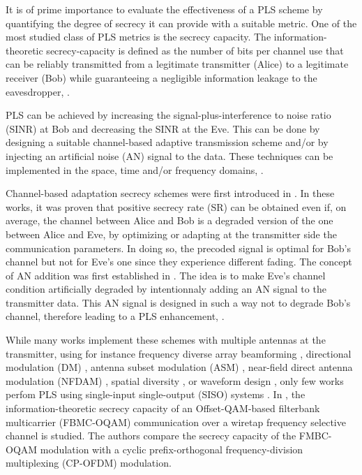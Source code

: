 \documentclass[journal,comsoc]{IEEEtran}
\begin{document}
It is of prime importance to evaluate the effectiveness of a PLS scheme by quantifying the degree of secrecy it can provide with a suitable metric. One of the most studied class of PLS metrics is the secrecy capacity. The information-theoretic secrecy-capacity is defined as the number of bits per channel use that can be reliably transmitted from a legitimate transmitter (Alice) to a legitimate receiver (Bob) while guaranteeing a negligible information leakage to the eavesdropper, \cite{bloch_barros_2011}.

 PLS can be achieved by increasing the signal-plus-interference to noise ratio (SINR) at Bob and decreasing the SINR at the Eve. This can be done by designing a suitable channel-based adaptive transmission scheme and/or by injecting an artificial noise (AN) signal to the data. These techniques can be implemented in the space, time and/or frequency domains, \cite{8509094,7762075,MELKI20191}.

Channel-based adaptation secrecy schemes were first introduced in \cite{4529264,4529282,4626059}. In these works, it was proven that positive secrecy rate (SR) can be obtained even if, on average, the channel between Alice and Bob is a degraded version of the one between Alice and Eve, by optimizing or adapting at the transmitter side the communication parameters. In doing so, the precoded signal is optimal for Bob's channel but not for Eve's one since they experience different fading. The concept of AN addition was first established in \cite{1558439,1605889,4543070}. The idea is to make Eve's channel condition artificially degraded by intentionnaly adding an AN signal to the transmitter data. This AN signal is designed in such a way not to degrade Bob's channel, therefore leading to a PLS enhancement, \cite{8509094}.

While many works implement these schemes with multiple antennas at the transmitter, using for instance frequency diverse array beamforming \cite{li_qiang_2018_1159254,8078202}, directional modulation (DM) \cite{5159486},  antenna subset modulation (ASM) \cite{6544472}, near-field direct antenna modulation (NFDAM) \cite{4684619,4523120}, spatial diversity \cite{5580113,7070667,8786136,5738303}, or waveform design \cite{9062307}, only few works perfom PLS using single-input single-output (SISO) systems \cite{li2013waveform,9003692,8093595,8093591,xu2018security,li2018artificial,li2017artificial,9049811,7475864,7041552}. In \cite{9062307}, the information-theoretic secrecy capacity of an Offset-QAM-based filterbank multicarrier (FBMC-OQAM) communication over a wiretap frequency selective channel is studied. The authors compare the secrecy capacity of the FMBC-OQAM modulation with a cyclic prefix-orthogonal frequency-division multiplexing (CP-OFDM) modulation.
\end{document}

